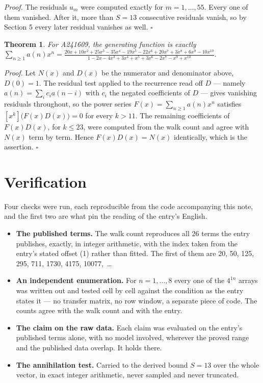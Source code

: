 \documentclass[11pt]{article}
\newtheorem{theorem}{Theorem}
\theoremstyle{definition}
\begin{document}
{\itshape Proof.} The residuals $u_m$ were computed exactly for $m = 1,\dots,55$. Every one of them vanished. After it, more than $S = 13$ consecutive residuals vanish, so by Section 5 every later residual vanishes as well. $\square$

\begin{theorem} For A241609, the generating function is exactly $\sum_{n\ge 1} a(n)x^n = \frac{20x + 10x^{2} + 25x^{3} - 35x^{4} - 19x^{5} - 22x^{6} + 20x^{7} + 3x^{8} + 6x^{9} - 10x^{10}}{1 - 2x - 4x^{3} + 3x^{4} + x^{5} + 3x^{6} - 2x^{7} - x^{9} + x^{10}}$.\end{theorem}

{\itshape Proof.} Let $N(x)$ and $D(x)$ be the numerator and denominator above, $D(0)=1$. The residual test applied to the recurrence read off $D$ --- namely $a(n) = \sum_i c_i a(n-i)$ with $c_i$ the negated coefficients of $D$ --- gives vanishing residuals throughout, so the power series $F(x)=\sum_{n\ge 1}a(n)x^n$ satisfies $[x^k]\bigl(F(x)D(x)\bigr) = 0$ for every $k > 11$. The remaining coefficients of $F(x)D(x)$, for $k \le 23$, were computed from the walk count and agree with $N(x)$ term by term. Hence $F(x)D(x) = N(x)$ identically, which is the assertion. $\square$

\section{Verification}

Four checks were run, each reproducible from the code accompanying this note, and the first two are what pin the reading of the entry's English.

\begin{itemize}

\item {\bfseries The published terms.} The walk count reproduces all 26 terms the entry publishes, exactly, in integer arithmetic, with the index taken from the entry's stated offset (1) rather than fitted. The first of them are 20, 50, 125, 295, 711, 1730, 4175, 10077,~\dots

\item {\bfseries An independent enumeration.} For $n = 1,\dots,8$ every one of the $4^{1n}$ arrays was written out and tested cell by cell against the condition as the entry states it --- no transfer matrix, no row window, a separate piece of code. The counts agree with the walk count and with the entry.

\item {\bfseries The claim on the raw data.} Each claim was evaluated on the entry's published terms alone, with no model involved, wherever the proved range and the published data overlap. It holds there.

\item {\bfseries The annihilation test.} Carried to the derived bound $S = 13$ over the whole vector, in exact integer arithmetic, never sampled and never truncated.

\end{itemize}
\end{document}
